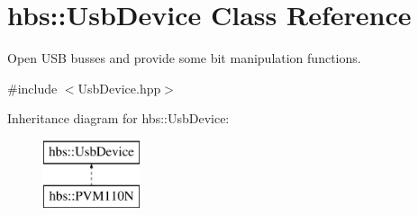 \hypertarget{classhbs_1_1_usb_device}{\section{hbs\-:\-:Usb\-Device Class Reference}
\label{classhbs_1_1_usb_device}
}


Open U\-S\-B busses and provide some bit manipulation functions.  




{\ttfamily \#include $<$Usb\-Device.\-hpp$>$}

Inheritance diagram for hbs\-:\-:Usb\-Device\-:\begin{figure}[H]
\begin{center}
\leavevmode
\includegraphics[height=2.000000cm]{classhbs_1_1_usb_device}
\end{center}
\end{figure}
